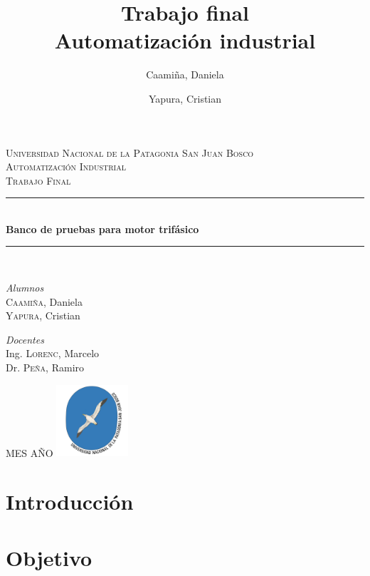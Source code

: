 \documentclass[12pt,a4paper]{article}
\date{}
\author{Caamiña, Daniela \and Yapura, Cristian}
\title{Trabajo final \\Automatización industrial}
\begin{document}
	\begin{titlepage} %
		\newcommand{\HRule}{\rule{\linewidth}{0.5mm}} 
		\center %
		\textsc{\LARGE Universidad Nacional de la Patagonia San Juan Bosco}\\[1.5cm]
		\textsc{\Large Automatización Industrial}\\[0.5cm]
		\textsc{\large Trabajo Final}\\[0.5cm] 
		\HRule\\[0.4cm]
		\huge\bfseries{Banco de pruebas para motor trifásico}\\[0.2cm] 
		\HRule\\[1.5cm]
			\begin{minipage}{0.4\textwidth}
				\begin{flushleft}
					\large
					\textit{Alumnos}\\
					\textsc{Caamiña,} Daniela \\
					\textsc{Yapura,} Cristian  
				\end{flushleft}
			\end{minipage}
			\begin{minipage}{0.4\textwidth}
				\begin{flushright}
					\large
					\textit{Docentes}\\
					Ing. \textsc{Lorenc,} Marcelo \\
					Dr. \textsc{Peña,} Ramiro  
				\end{flushright}
			\end{minipage}
		\vfill\vfill\vfill 
		\large{MES AÑO} 
		\vfill\vfill
		\includegraphics[width=0.2\textwidth]{unpsjb.png}\\[1cm] 
		\vfill 
	\end{titlepage}
	
\tableofcontents
\newpage

\listoffigures
\newpage	
		
\section{Introducción}


\section{Objetivo}

\end{document}
